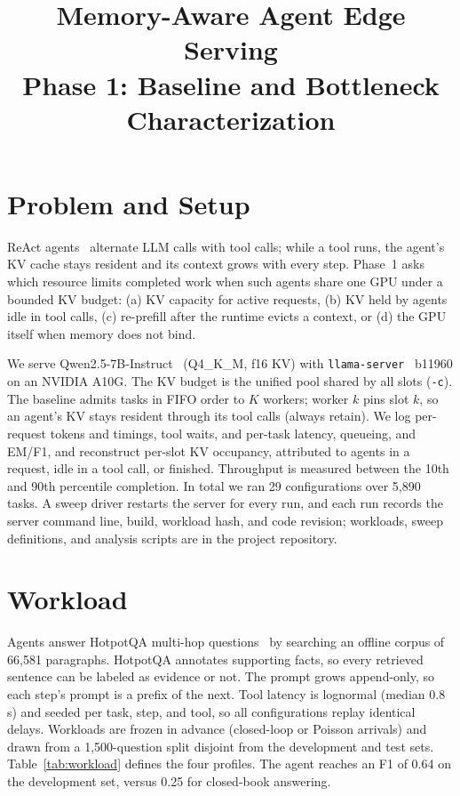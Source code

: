 \documentclass[conference]{IEEEtran}
\newcommand{\K}{$K$}
\begin{document}
\title{Memory-Aware Agent Edge Serving\\
\large Phase 1: Baseline and Bottleneck Characterization}

\author{
}

\maketitle

\section{Problem and Setup}

ReAct agents~\cite{react} alternate LLM calls with tool calls; while a tool runs, the agent's KV cache
stays resident and its context grows with every step. Phase~1 asks which resource limits completed work
when such agents share one GPU under a bounded KV budget: (a) KV capacity for active requests, (b) KV
held by agents idle in tool calls, (c) re-prefill after the runtime evicts a context, or (d) the GPU
itself when memory does not bind.

We serve Qwen2.5-7B-Instruct~\cite{qwen} (Q4\_K\_M, f16 KV) with \texttt{llama-server}~\cite{llamacpp}
b11960 on an NVIDIA A10G. The KV budget is the unified pool shared by all slots (\texttt{-c}). The
baseline admits tasks in FIFO order to \K{} workers; worker $k$ pins slot $k$, so an agent's KV stays
resident through its tool calls (always retain). We log per-request tokens and timings, tool waits, and
per-task latency, queueing, and EM/F1, and reconstruct per-slot KV occupancy, attributed to agents in a
request, idle in a tool call, or finished. Throughput is measured between the 10th and 90th percentile
completion. In total we ran 29 configurations over 5,890 tasks. A sweep driver restarts the server for every
run, and each run records the server command line, build, workload hash, and code revision; workloads,
sweep definitions, and analysis scripts are in the project repository.

\section{Workload}

Agents answer HotpotQA multi-hop questions~\cite{hotpotqa} by searching an offline corpus of 66,581
paragraphs. HotpotQA annotates supporting facts, so every retrieved sentence can be labeled as evidence
or not. The prompt grows append-only, so each step's prompt is a prefix of the next. Tool latency is
lognormal (median 0.8\,s) and seeded per task, step, and tool, so all configurations replay identical
delays. Workloads are frozen in advance (closed-loop or Poisson arrivals) and drawn from a 1,500-question
split disjoint from the development and test sets. Table~\ref{tab:workload} defines the four profiles.
The agent reaches an F1 of 0.64 on the development set, versus 0.25 for closed-book answering.
\end{document}
